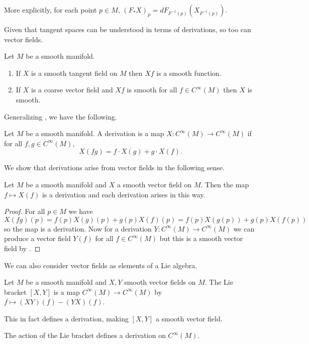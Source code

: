 \begin{remark}
    More explicitly, for each point $p\in M$, $(F_{*}X)_{p}=dF_{F^{-1}(p)}(X_{F^{-1}(p)})$.
\end{remark}
Given that tangent spaces can be understood in terms of derivations, so too can vector fields. 
\begin{lemma}\label{lem: smooth vector fields and functions}
    Let $M$ be a smooth manifold.
    \begin{enumerate}[label=(\roman*)]
        \item If $X$ is a smooth tangent field on $M$ then $Xf$ is a smooth function. 
        \item If $X$ is a coarse vector field and $Xf$ is smooth for all $f\in C^{\infty}(M)$ then $X$ is smooth. 
    \end{enumerate}
\end{lemma}
Generalizing , we have the following. 
\begin{definition}[Derivation]\label{def: generalized derivation}
    Let $M$ be a smooth manifold. A derivation is a map $X:C^{\infty}(M)\to C^{\infty}(M)$ if for all $f,g\in C^{\infty}(M)$,
    $$X(fg)=f\cdot X(g)+g\cdot X(f).$$
\end{definition}
We show that derivations arise from vector fields in the following sense. 
\begin{proposition}\label{prop: all derivations are vector fields}
    Let $M$ be a smooth manifold and $X$ a smooth vector field on $M$. Then the map $f\mapsto X(f)$ is a derivation and each derivation arises in this way. 
\end{proposition}
\begin{proof}
    For all $p\in M$ we have $X(fg)(p)=f(p)X(g)(p)+g(p)X(f)(p)=f(p)X(g(p))+g(p)X(f(p))$ so the map is a derivation. Now for a derivation $Y:C^{\infty}(M)\to C^{\infty}(M)$ we can produce a vector field $Y(f)$ for all $f\in C^{\infty}(M)$ but this is a smooth vector field by . 
\end{proof}
We can also consider vector fields as elements of a Lie algebra. 
\begin{definition}\label{def: Lie bracket}
    Let $M$ be a smooth manifold and $X,Y$ smooth vector fields on $M$. The Lie bracket $[X,Y]$ is a map $C^{\infty}(M)\to C^{\infty}(M)$ by $f\mapsto (XY)(f)-(YX)(f)$. 
\end{definition}
This in fact defines a derivation, making $[X,Y]$ a smooth vector field. 
\begin{lemma}\label{lem: Lie bracket is a smooth vector field}
    The action of the Lie bracket defines a derivation on $C^{\infty}(M)$. 
\end{lemma}
